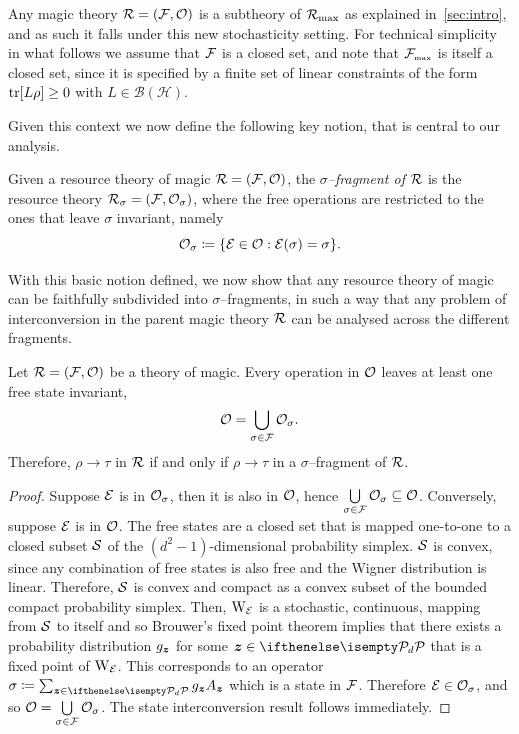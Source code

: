 \documentclass[pra,
aps,
twocolumn,
superscriptaddress,
groupedaddress,
nofootinbib,
reprint
]{revtex4-1}
\begin{document}
Any magic theory $\R = (\F, \O)$ is a subtheory of $\Rmax$ as explained in~\cref{sec:intro}, and as such it falls under this new stochasticity setting. For technical simplicity in what follows we assume that $\F$ is a closed set, and note that $\F_{\mbox{\tiny max}}$ is itself a closed set, since it is specified by a finite set of linear constraints of the form $\tr [ L\rho] \ge 0$ with $L \in \mathcal{B}(\mathcal{H})$.


Given this context we now define the following key notion, that is central to our analysis.
\begin{definition}\label{def:sigmafrag}
   Given a resource theory of magic $\R = (\F, \O)$, the \emph{$\sigma$--fragment of $\R$} is the resource theory $\R_\sigma = (\F, \O_\sigma)$, where the free operations are restricted to the ones that leave $\sigma$ invariant, namely
    \begin{equation}
        \O_\sigma \coloneqq \{ \E \in \O: \E(\sigma) = \sigma \}.
    \end{equation}
\end{definition}

With this basic notion defined, we now show that any resource theory of magic can be faithfully subdivided into $\sigma$--fragments, in such a way that any problem of interconversion in the parent magic theory $\R$ can be analysed across the different fragments.

\begin{theorem}
    Let $\R = (\F, \O)$ be a theory of magic.
    Every operation in $\O$ leaves at least one free state invariant,
  \begin{equation}
\O = \bigcup\limits_{\sigma \in \F} \O_\sigma.
\end{equation}
Therefore, $\rho\longrightarrow \tau$ in $\R$ if and only if $\rho\longrightarrow \tau$ in a $\sigma$--fragment of $\R$.
\end{theorem}
\begin{proof}
    Suppose $\E$ is in $\O_\sigma$, then it is also in $\O$, hence $\bigcup\limits_{\sigma \in \F} \O_\sigma \subseteq \O$. Conversely, suppose $\E$ is in $\O$. 
    The free states are a closed set that is mapped one-to-one to a closed subset $\cal{S}$ of the $(d^2 - 1)$-dimensional probability simplex.
    $\cal{S}$ is convex, since any combination of free states is also free and the Wigner distribution is linear.
    Therefore, $\cal{S}$ is convex and compact as a convex subset of the bounded compact probability simplex.
    Then, $\W{\E}{}$ is a stochastic, continuous, mapping from $\cal{S}$ to itself and so Brouwer's fixed point theorem  implies that there exists a probability distribution $g_{\bmz}$ for some $ \bmz \in \pd$ that is a fixed point of $\W{\E}{}$.
    This corresponds to an operator $\sigma \coloneqq \sum_{\bmz \in \pd} g_{\bmz} A_{\bmz}$  which is a state in $\F$. Therefore $\E \in \O_\sigma$, and so $\O = \bigcup\limits_{\sigma \in \F} \O_\sigma$. The state interconversion result follows immediately.
\end{proof}
\end{document}
